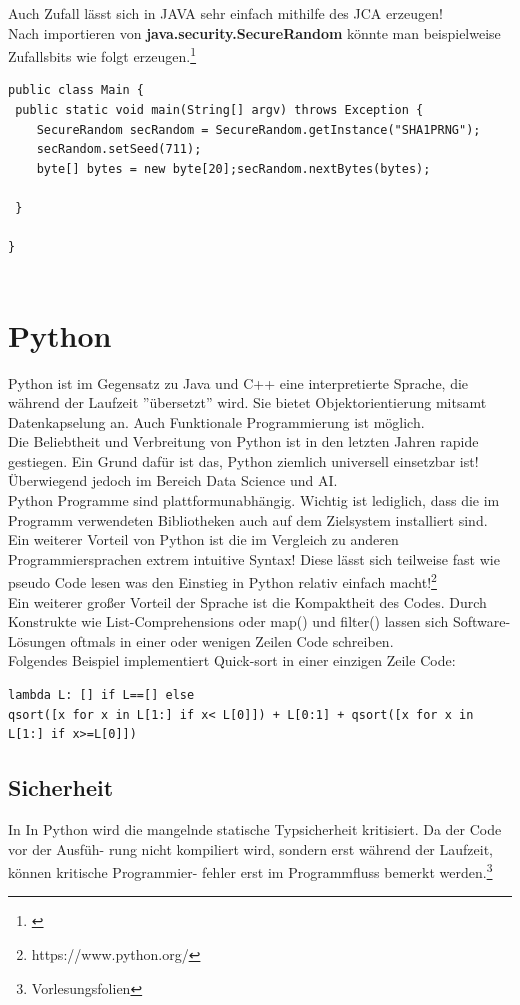 \documentclass[a4paper,12pt]{scrartcl}
\begin{document}
Auch Zufall lässt sich in JAVA sehr einfach mithilfe des JCA erzeugen!\\
Nach importieren von \textbf{java.security.SecureRandom} könnte man beispielweise Zufallsbits wie folgt erzeugen.\footnote{\cite{1265452}}
\begin{verbatim}
public class Main {
 public static void main(String[] argv) throws Exception {
    SecureRandom secRandom = SecureRandom.getInstance("SHA1PRNG");
    secRandom.setSeed(711);
    byte[] bytes = new byte[20];secRandom.nextBytes(bytes);

 }

}


\end{verbatim}
\newpage



\section{Python}
Python ist im Gegensatz zu Java und C++ eine interpretierte Sprache, die während der
Laufzeit ”übersetzt” wird. Sie bietet Objektorientierung mitsamt Datenkapselung an. Auch Funktionale Programmierung ist möglich.\\
Die Beliebtheit und Verbreitung von Python ist in den letzten
Jahren rapide gestiegen. Ein Grund dafür ist das, Python ziemlich universell einsetzbar ist! Überwiegend jedoch im Bereich Data Science und AI.\\Python Programme sind plattformunabhängig. Wichtig ist lediglich, dass die im Programm
verwendeten Bibliotheken auch auf dem Zielsystem installiert sind.\\
Ein weiterer Vorteil von Python ist die im Vergleich zu anderen Programmiersprachen extrem intuitive Syntax! Diese lässt sich teilweise fast wie pseudo Code lesen was den Einstieg in Python relativ einfach macht!\footnote{https://www.python.org/}\\
Ein weiterer großer Vorteil der Sprache ist die Kompaktheit des Codes. Durch Konstrukte wie List-Comprehensions oder map() und filter() lassen sich Software-Lösungen oftmals in einer oder wenigen Zeilen Code schreiben.\\
Folgendes Beispiel implementiert Quick-sort in einer einzigen Zeile Code:
\begin{verbatim}
lambda L: [] if L==[] else 
qsort([x for x in L[1:] if x< L[0]]) + L[0:1] + qsort([x for x in L[1:] if x>=L[0]])
\end{verbatim}


\subsection{Sicherheit}
In 
In Python wird die mangelnde statische Typsicherheit kritisiert. Da der Code vor der Ausfüh-
rung nicht kompiliert wird, sondern erst während der Laufzeit, können kritische Programmier-
fehler erst im Programmfluss bemerkt werden.\footnote{Vorlesungsfolien}
\newpage
\end{document}
